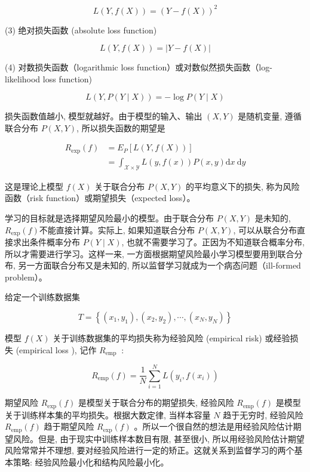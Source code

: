 \documentclass[10pt]{article}
\begin{document}
\begin{CJK*}{UTF8}{bsmi}
\begin{equation*}
L(Y, f(X))=(Y-f(X))^{2} \tag{1.10}
\end{equation*}


(3) 绝对损失函数 (absolute loss function)


\begin{equation*}
L(Y, f(X))=|Y-f(X)| \tag{1.11}
\end{equation*}


(4) 对数损失函数（logarithmic loss function）或对数似然损失函数（log-likelihood loss function)


\begin{equation*}
L(Y, P(Y \mid X))=-\log P(Y \mid X) \tag{1.12}
\end{equation*}


损失函数值越小, 模型就越好。由于模型的输入、输出 $(X, Y)$ 是随机变量, 遵循联合分布 $P(X, Y)$, 所以损失函数的期望是


\begin{align*}
R_{\exp }(f) & =E_{P}[L(Y, f(X))] \\
& =\int_{\mathcal{X} \times \mathcal{Y}} L(y, f(x)) P(x, y) \mathrm{d} x \mathrm{~d} y \tag{1.13}
\end{align*}


这是理论上模型 $f(X)$ 关于联合分布 $P(X, Y)$ 的平均意义下的损失, 称为风险函数（risk function）或期望损失（expected loss）。

学习的目标就是选择期望风险最小的模型。由于联合分布 $P(X, Y)$ 是未知的, $R_{\exp }(f)$不能直接计算。实际上, 如果知道联合分布 $P(X, Y)$, 可以从联合分布直接求出条件概率分布 $P(Y \mid X)$, 也就不需要学习了。正因为不知道联合概率分布, 所以才需要进行学习。这样一来, 一方面根据期望风险最小学习模型要用到联合分布, 另一方面联合分布又是未知的, 所以监督学习就成为一个病态问题（ill-formed problem）。

给定一个训练数据集

$$
T=\left\{\left(x_{1}, y_{1}\right),\left(x_{2}, y_{2}\right), \cdots,\left(x_{N}, y_{N}\right)\right\}
$$

模型 $f(X)$ 关于训练数据集的平均损失称为经验风险 (empirical risk) 或经验损失 (empirical loss ), 记作 $R_{\text {emp }}$ :


\begin{equation*}
R_{\mathrm{emp}}(f)=\frac{1}{N} \sum_{i=1}^{N} L\left(y_{i}, f\left(x_{i}\right)\right) \tag{1.14}
\end{equation*}


期望风险 $R_{\exp }(f)$ 是模型关于联合分布的期望损失, 经验风险 $R_{\mathrm{emp}}(f)$ 是模型关于训练样本集的平均损失。根据大数定律, 当样本容量 $N$ 趋于无穷时, 经验风险 $R_{\mathrm{emp}}(f)$ 趋于期望风险 $R_{\exp }(f)$ 。所以一个很自然的想法是用经验风险估计期望风险。但是, 由于现实中训练样本数目有限, 甚至很小, 所以用经验风险估计期望风险常常并不理想, 要对经验风险进行一定的矫正。这就关系到监督学习的两个基本策略: 经验风险最小化和结构风险最小化。


\end{CJK*}
\end{document}
